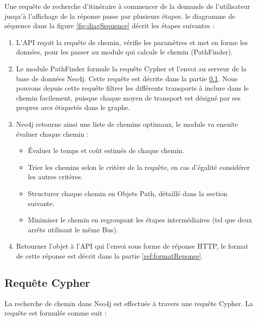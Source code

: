 Une requête de recherche d'itinéraire à commencer de la demande de l'utilisateur jusqu'à l'affichage de la réponse passe par plusieurs étapes. le diagramme de séquence dans la figure \ref{fig:diagSequence} décrit les étapes suivantes :
\begin{enumerate}
	\item L'API reçoit la requête de chemin, vérifie les paramètres et met en forme les données, pour les passer au module qui calcule le chemin (PathFinder).
	\item Le module PathFinder formule la requête Cypher et l'envoi au serveur de la base de données Neo4j. Cette requête est décrite dans la partie \ref{section:cypher}.
	      Nous pouvons depuis cette requête filtrer les différents transports à inclure dans le chemin facilement, puisque chaque moyen de transport est désigné par ses propres arcs étiquetés dans le graphe.
	\item Neo4j retourne ainsi une liste de chemins optimaux, le module va ensuite évaluer chaque chemin :
	      \begin{itemize}
	      	\item Évaluer le temps et coût estimés de chaque chemin.
	      	\item Trier les chemins selon le critère de la requête, en cas d'égalité considérer les autres critères.
	      	\item Structurer chaque chemin en Objets Path, détaillé dans la section suivante.
	      	\item Minimiser le chemin en regroupant les étapes intermédiaires (tel que deux arrêts utilisant le même Bus).
	      \end{itemize}
	\item Retourner l'objet à l'API qui l'envoi sous forme de réponse HTTP, le format de cette réponse est décrit dans la partie \ref{ref:formatReponse}.
\end{enumerate}
\label{SectionPathFinding}
	
\subsection{Requête Cypher}
\label{section:cypher}

La recherche de chemin dans Neo4j est effectuée à travers une requête Cypher. La requête est formulée comme suit :

